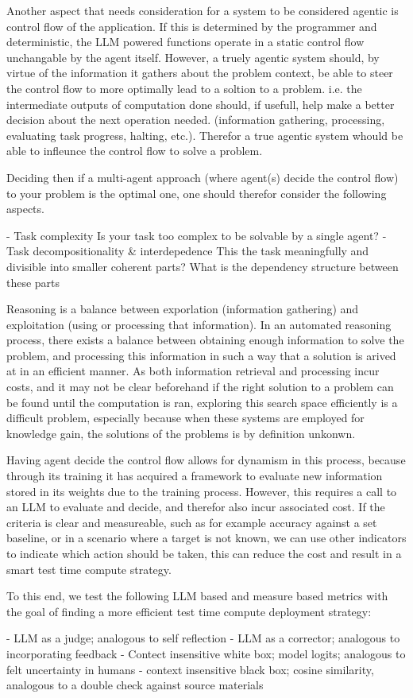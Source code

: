  Another aspect that needs consideration for a system to be considered agentic is control flow of the application. If this is determined by the programmer and deterministic, the LLM powered functions operate in a static control flow unchangable by the agent itself. However, a truely agentic system should, by virtue of the information it gathers about the problem context, be able to steer the control flow to more optimally lead to a soltion to a problem. i.e. the intermediate outputs of computation done should, if usefull, help make a better decision about the next operation needed. (information gathering, processing, evaluating task progress, halting, etc.). Therefor a true agentic system whould be able to infleunce the control flow to solve a problem.

 Deciding then if a multi-agent approach (where agent(s) decide the control flow) to your problem is the optimal one, one should therefor consider the following aspects.

 - Task complexity
 Is your task too complex to be solvable by a single agent?
 - Task decompositionality \& interdepedence
 This the task meaningfully and divisible into smaller coherent parts? What is the dependency structure between these parts


Reasoning is a balance between exporlation (information gathering) and exploitation (using or processing that information). In an automated reasoning process, there exists a balance between obtaining enough information to solve the problem, and processing this information in such a way that a solution is arived at in an efficient manner. As both information retrieval and processing incur costs, and it may not be clear beforehand if the right solution to a problem can be found until the computation is ran, exploring this search space efficiently is a difficult problem, especially because when these systems are employed for knowledge gain, the solutions of the problems is by definition unkonwn.


Having agent decide the control flow allows for dynamism in this process, because through its training it has acquired a framework to evaluate new information stored in its weights due to the training process. However, this requires a call to an LLM to evaluate and decide, and therefor also incur associated cost.
If the criteria is clear and measureable, such as for example accuracy against a set baseline, or in a scenario where a target is not known, we can use other indicators to indicate which action should be taken, this can reduce the cost and result in a smart test time compute strategy.

To this end, we test the following LLM based and measure based metrics with the goal of finding a more efficient test time compute deployment strategy:

    - LLM as a judge; analogous to self reflection
    - LLM as a corrector; analogous to incorporating feedback
    - Contect insensitive white box; model logits; analogous to felt uncertainty in humans
    - context insensitive black box; cosine similarity, analogous to a double check against source materials


 
 
\label{Introduction}